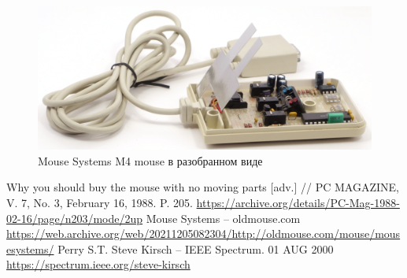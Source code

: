 \documentclass[11pt, a4paper]{article}
\begin{document}
\begin{figure}[h]
    \centering
    \includegraphics[scale=0.6]{1988_mouse_systems_m4/inside_30.jpg}
    \caption{Mouse Systems M4 mouse в разобранном виде}
    \label{fig:mscM4Inside}
\end{figure}


\begin{thebibliography}{9}
 Why you should buy the mouse with no moving parts [adv.] // PC MAGAZINE, V. 7, No. 3, February 16, 1988. P. 205. \url{https://archive.org/details/PC-Mag-1988-02-16/page/n203/mode/2up}
 Mouse Systems -- oldmouse.com  \url{https://web.archive.org/web/20211205082304/http://oldmouse.com/mouse/mousesystems/}
 Perry S.T. Steve Kirsch -- IEEE Spectrum. 01 AUG 2000 \url{https://spectrum.ieee.org/steve-kirsch}
\end{thebibliography}
\end{document}
